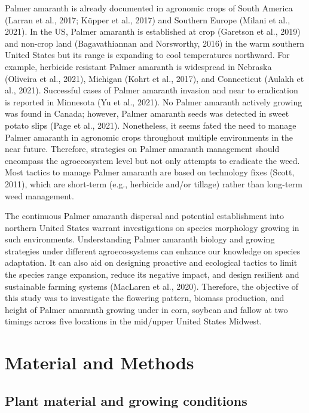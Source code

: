 \documentclass[utf8]{frontiersSCNS}
\begin{document}
Palmer amaranth is already documented in agronomic crops of South
America (Larran et al., 2017; Küpper et al., 2017) and Southern Europe
(Milani et al., 2021). In the US, Palmer amaranth is established at crop
(Garetson et al., 2019) and non-crop land (Bagavathiannan and
Norsworthy, 2016) in the warm southern United States but its range is
expanding to cool temperatures northward. For example, herbicide
resistant Palmer amaranth is widespread in Nebraska (Oliveira et al.,
2021), Michigan (Kohrt et al., 2017), and Connecticut (Aulakh et al.,
2021). Successful cases of Palmer amaranth invasion and near to
eradication is reported in Minnesota (Yu et al., 2021). No Palmer
amaranth actively growing was found in Canada; however, Palmer amaranth
seeds was detected in sweet potato slips (Page et al., 2021).
Nonetheless, it seems fated the need to manage Palmer amaranth in
agronomic crops throughout multiple environments in the near future.
Therefore, strategies on Palmer amaranth management should encompass the
agroecosystem level but not only attempts to eradicate the weed. Most
tactics to manage Palmer amaranth are based on technology fixes (Scott,
2011), which are short-term (e.g., herbicide and/or tillage) rather than
long-term weed management.

The continuous Palmer amaranth dispersal and potential establishment
into northern United States warrant investigations on species morphology
growing in such environments. Understanding Palmer amaranth biology and
growing strategies under different agroecossystems can enhance our
knowledge on species adaptation. It can also aid on designing proactive
and ecological tactics to limit the species range expansion, reduce its
negative impact, and design resilient and sustainable farming systems
(MacLaren et al., 2020). Therefore, the objective of this study was to
investigate the flowering pattern, biomass production, and height of
Palmer amaranth growing under in corn, soybean and fallow at two timings
across five locations in the mid/upper United States Midwest.

\hypertarget{material-and-methods}{%
\section*{Material and Methods}\label{material-and-methods}}

\hypertarget{plant-material-and-growing-conditions}{%
\subsection*{Plant material and growing
conditions}\label{plant-material-and-growing-conditions}}
\end{document}

